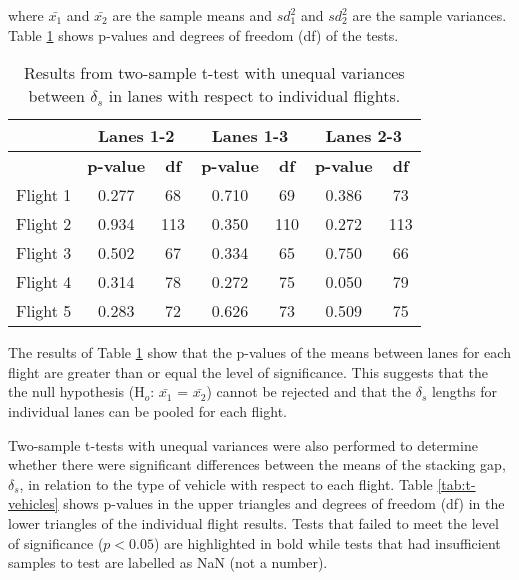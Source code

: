 \noindent
where $\bar{x_{1}}$ and $\bar{x_{2}}$ are the sample means and  $sd^{2}_{1}$ and $sd^{2}_{2}$ are the sample variances. Table \ref{tab:ttest-lanes} shows p-values and degrees of freedom (df) of the tests.

\begin{table}[H]
\centering
\caption{Results from two-sample t-test with unequal variances between $\delta_{s}$ in lanes with respect to individual flights.}
\label{tab:ttest-lanes}
\begin{tabular}{@{}ccc|cc|cc@{}}
\toprule
 & \multicolumn{2}{c}{\textbf{Lanes 1-2}} & \multicolumn{2}{c}{\textbf{Lanes 1-3}} & \multicolumn{2}{c}{\textbf{Lanes 2-3}} \\ \midrule
 & \textbf{p-value} & \textbf{df} & \textbf{p-value} & \textbf{df} & \textbf{p-value} & \textbf{df} \\
Flight 1 & 0.277 & 68 & 0.710 & 69 & 0.386 & 73 \\
Flight 2 & 0.934 & 113 & 0.350 & 110 & 0.272 & 113 \\
Flight 3 & 0.502 & 67 & 0.334 & 65 & 0.750 & 66 \\
Flight 4 & 0.314 & 78 & 0.272 & 75 & 0.050 & 79 \\
Flight 5 & 0.283 & 72 & 0.626 & 73 & 0.509 & 75 \\ \bottomrule
\end{tabular}
\end{table}

The results of Table \ref{tab:ttest-lanes} show that the p-values of the means between lanes for each flight are greater than or equal the level of significance. This suggests that the the null hypothesis (H$_{o}$: $\bar{x_{1}}$ = $\bar{x_{2}}$) cannot be rejected and that the $\delta_{s}$ lengths for individual lanes can be pooled for each flight.

Two-sample t-tests with unequal variances were also performed to determine whether there were significant differences between the means of the stacking gap, $\delta_{s}$, in relation to the type of vehicle with respect to each flight. Table \ref{tab:t-vehicles} shows p-values in the upper triangles and degrees of freedom (df) in the lower triangles of the individual flight results. Tests that failed to meet the level of significance ($p<0.05$) are highlighted in bold while tests that had insufficient samples to test are labelled as NaN (not a number).

